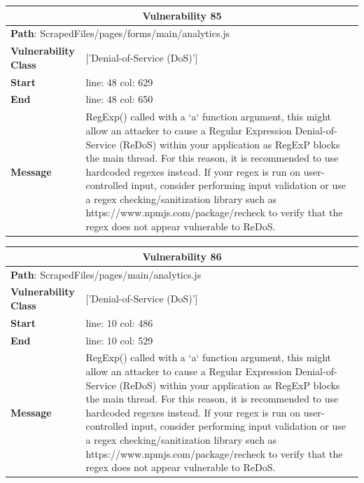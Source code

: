 \documentclass[12pt]{article}
\begin{document}
\vspace{0.7cm}
\FloatBarrier
\begin{table}[!h]
\centering
\renewcommand{\arraystretch}{1.3}
\begin{tabular}{|l|p{10cm}|}
\hline
\multicolumn{2}{|c|}{\textbf{Vulnerability 85}} \\
\hline
\multicolumn{2}{|l|}{\textbf{Path}: ScrapedFiles/pages/forms/main/analytics.js} \\
\hline
\textbf{Vulnerability Class} & ['Denial-of-Service (DoS)'] \\
\hline
\textbf{Start} & line: 48 \quad col: 629 \\
\hline
\textbf{End} & line: 48 \quad col: 650 \\
\hline
\textbf{Message} & RegExp() called with a `a` function argument, this might allow an attacker to cause a Regular Expression Denial-of-Service (ReDoS) within your application as RegExP blocks the main thread. For this reason, it is recommended to use hardcoded regexes instead. If your regex is run on user-controlled input, consider performing input validation or use a regex checking/sanitization library such as https://www.npmjs.com/package/recheck to verify that the regex does not appear vulnerable to ReDoS. \\
\hline
\end{tabular}
\end{table}
\vspace{0.7cm}
\FloatBarrier
\begin{table}[!h]
\centering
\renewcommand{\arraystretch}{1.3}
\begin{tabular}{|l|p{10cm}|}
\hline
\multicolumn{2}{|c|}{\textbf{Vulnerability 86}} \\
\hline
\multicolumn{2}{|l|}{\textbf{Path}: ScrapedFiles/pages/main/analytics.js} \\
\hline
\textbf{Vulnerability Class} & ['Denial-of-Service (DoS)'] \\
\hline
\textbf{Start} & line: 10 \quad col: 486 \\
\hline
\textbf{End} & line: 10 \quad col: 529 \\
\hline
\textbf{Message} & RegExp() called with a `a` function argument, this might allow an attacker to cause a Regular Expression Denial-of-Service (ReDoS) within your application as RegExP blocks the main thread. For this reason, it is recommended to use hardcoded regexes instead. If your regex is run on user-controlled input, consider performing input validation or use a regex checking/sanitization library such as https://www.npmjs.com/package/recheck to verify that the regex does not appear vulnerable to ReDoS. \\
\hline
\end{tabular}
\end{table}
\end{document}
